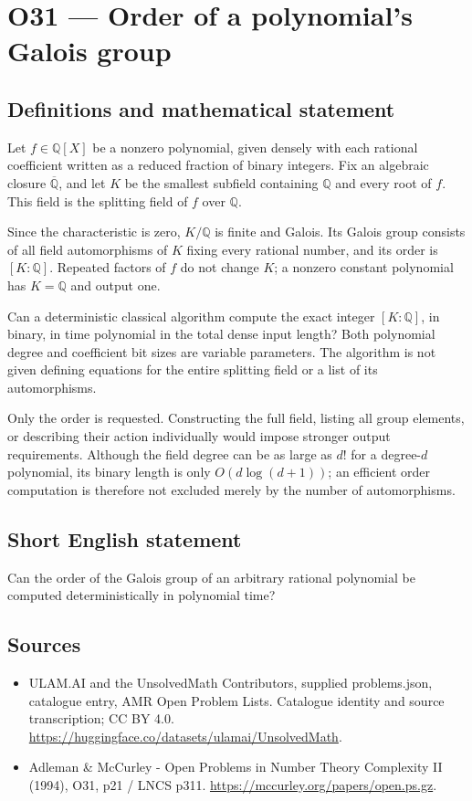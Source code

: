 \documentclass[11pt,a4paper]{article}
\begin{document}
\section*{O31 — Order of a polynomial's Galois group}\label{statement}

\subsection{Definitions and mathematical statement}
Let $f\in\mathbb Q[X]$ be a nonzero polynomial, given densely with each rational coefficient written as a reduced fraction of binary integers. Fix an algebraic closure $\overline{\mathbb Q}$, and let $K$ be the smallest subfield containing $\mathbb Q$ and every root of $f$. This field is the splitting field of $f$ over $\mathbb Q$.

Since the characteristic is zero, $K/\mathbb Q$ is finite and Galois. Its Galois group consists of all field automorphisms of $K$ fixing every rational number, and its order is $[K:\mathbb Q]$. Repeated factors of $f$ do not change $K$; a nonzero constant polynomial has $K=\mathbb Q$ and output one.

Can a deterministic classical algorithm compute the exact integer $[K:\mathbb Q]$, in binary, in time polynomial in the total dense input length? Both polynomial degree and coefficient bit sizes are variable parameters. The algorithm is not given defining equations for the entire splitting field or a list of its automorphisms.

Only the order is requested. Constructing the full field, listing all group elements, or describing their action individually would impose stronger output requirements. Although the field degree can be as large as $d!$ for a degree-$d$ polynomial, its binary length is only $O(d\log(d+1))$; an efficient order computation is therefore not excluded merely by the number of automorphisms.
\subsection{Short English statement}
Can the order of the Galois group of an arbitrary rational polynomial be computed deterministically in polynomial time?
\subsection{Sources}
\begin{itemize}
\item[S1] ULAM.AI and the UnsolvedMath Contributors, supplied problems.json, catalogue entry, AMR Open Problem Lists. Catalogue identity and source transcription; CC BY 4.0.
\url{https://huggingface.co/datasets/ulamai/UnsolvedMath}.
\item[S2] Adleman \& McCurley - Open Problems in Number Theory Complexity II (1994), O31, p21 / LNCS p311. 
\url{https://mccurley.org/papers/open.ps.gz}.
\end{itemize}
\end{document}
